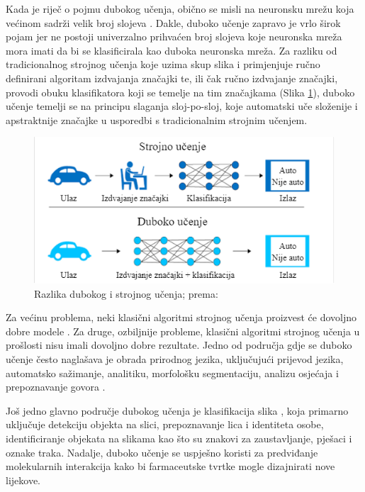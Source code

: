 \documentclass[]{foi} %
\begin{document}
\newpage
Kada je riječ o pojmu dubokog učenja, obično se misli na neuronsku mrežu koja većinom sadrži velik broj slojeva \cite{builtin1}. Dakle, duboko učenje zapravo je vrlo širok pojam jer ne postoji univerzalno prihvaćen broj slojeva koje neuronska mreža mora imati da bi se klasificirala kao duboka neuronska mreža. Za razliku od tradicionalnog strojnog učenja koje uzima skup slika i primjenjuje ručno definirani algoritam izdvajanja značajki te, ili čak ručno izdvajanje značajki, provodi obuku klasifikatora koji se temelje na tim značajkama (Slika \ref{fig:mlvsdl}), duboko učenje temelji se na principu slaganja sloj-po-sloj, koje automatski uče složenije i apstraktnije značajke u usporedbi s tradicionalnim strojnim učenjem.

\vspace{10mm}
\begin{figure}[!ht]
    \centering
    \includegraphics[width=1\textwidth]{slike/mlvsdl.png}
    \caption{Razlika dubokog i strojnog učenja; prema: \cite{builtin1}}
    \label{fig:mlvsdl}
\end{figure}
\vspace{10mm}

Za većinu problema, neki klasični algoritmi strojnog učenja proizvest će dovoljno dobre modele \cite{tds2}. Za druge, ozbiljnije probleme, klasični algoritmi strojnog učenja u prošlosti nisu imali dovoljno dobre rezultate. Jedno od područja gdje se duboko učenje često naglašava je obrada prirodnog jezika, uključujući prijevod jezika, automatsko sažimanje, analitiku, morfološku segmentaciju, analizu osjećaja i prepoznavanje govora \cite{tds1}.

Još jedno glavno područje dubokog učenja je klasifikacija slika \cite{tds1}, koja primarno uključuje detekciju objekta na slici, prepoznavanje lica i identiteta osobe, identificiranje objekata na slikama kao što su znakovi za zaustavljanje, pješaci i oznake traka. Nadalje, duboko učenje se uspješno koristi za predviđanje molekularnih interakcija kako bi farmaceutske tvrtke mogle dizajnirati nove lijekove.
\end{document}
